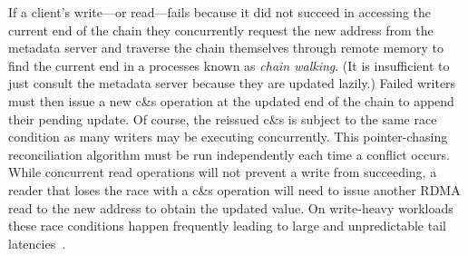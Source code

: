 If a client's write---or read---fails because it did not succeed in
accessing the current end of the chain they concurrently request the
new address from the metadata server and traverse the chain themselves
through remote memory to find the current end in a processes known as
\emph{chain walking}.  (It is insufficient to just consult the
metadata server because they are updated lazily.)  Failed writers must
then issue a new c\&s operation at the updated end of the chain to append
their pending update.  Of course, the reissued c\&s is subject to the
same race condition as many writers may be executing
concurrently. This pointer-chasing reconciliation algorithm must be
run independently each time a conflict occurs.
While concurrent read operations will not prevent a write from
succeeding, a reader that loses the race with a c\&s operation will
need to issue another RDMA read to the new address to obtain the
updated value.  On write-heavy workloads these race conditions happen
frequently
leading to large and unpredictable tail latencies~\cite[Table 2]{clover}.








